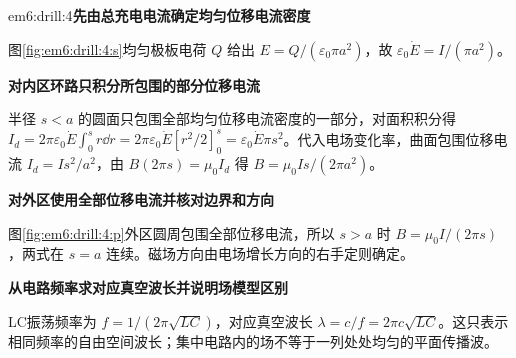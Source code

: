 \begin{drillsolution}{em6:drill:4}\textbf{先由总充电电流确定均匀位移电流密度}\par\nobreak
图\ref{fig:em6:drill:4:s}均匀极板电荷 $Q$ 给出 $E=Q/(\varepsilon_0\pi a^2)$，故 $\varepsilon_0\dot E=I/(\pi a^2)$。

\par\medskip{}\noindent\textbf{对内区环路只积分所包围的部分位移电流}\par\nobreak
半径 $s<a$ 的圆面只包围全部均匀位移电流密度的一部分，对面积积分得 $I_d=2\pi\varepsilon_0\dot E\int_0^s r\dd r
=2\pi\varepsilon_0\dot E[r^2/2]_0^s
=\varepsilon_0\dot E\pi s^2$。代入电场变化率，曲面包围位移电流 $I_d=I s^2/a^2$，由 $B(2\pi s)=\mu_0I_d$ 得 $B=\mu_0Is/(2\pi a^2)$。



\par\medskip{}\noindent\textbf{对外区使用全部位移电流并核对边界和方向}\par\nobreak
图\ref{fig:em6:drill:4:p}外区圆周包围全部位移电流，所以 $s>a$ 时 $B=\mu_0I/(2\pi s)$，两式在 $s=a$ 连续。磁场方向由电场增长方向的右手定则确定。

\par\medskip{}\noindent\textbf{从电路频率求对应真空波长并说明场模型区别}\par\nobreak
LC振荡频率为 $f=1/(2\pi\sqrt{LC})$，对应真空波长 $\lambda=c/f=2\pi c\sqrt{LC}$。这只表示相同频率的自由空间波长；集中电路内的场不等于一列处处均匀的平面传播波。\end{drillsolution}
